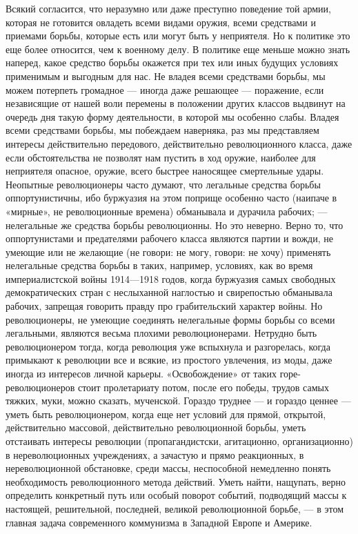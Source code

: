 \documentclass[12pt]{article}
\newcommand{\parnum}{(\arabic{parcount})}
\newcounter{parcount}
\newenvironment{parnumbers}{%
  \par%
  \everypar{\noindent \stepcounter{parcount}\marginpar[]{\parnum}}%
}{}
\begin{document}
\begin{parnumbers}
Всякий согласится, что неразумно или даже преступно поведение той армии, которая не готовится овладеть всеми видами оружия, всеми средствами и приемами борьбы, которые есть или могут быть у неприятеля. Но к политике это еще более относится, чем к военному делу. В политике еще меньше можно знать наперед, какое средство борьбы окажется при тех или иных будущих условиях применимым и выгодным для нас. Не владея всеми средствами борьбы, мы можем потерпеть громадное — иногда даже решающее — поражение, если независящие от нашей воли перемены в положении других классов выдвинут на очередь дня такую форму деятельности, в которой мы особенно слабы. Владея всеми средствами борьбы, мы побеждаем наверняка, раз мы представляем интересы действительно передового, действительно революционного класса, даже если обстоятельства не позволят нам пустить в ход оружие, наиболее для неприятеля опасное, оружие, всего быстрее наносящее смертельные удары. Неопытные революционеры часто думают, что легальные средства борьбы оппортунистичны, ибо буржуазия на этом поприще особенно часто (наипаче в «мирные», не революционные времена) обманывала и дурачила рабочих; — нелегальные же средства борьбы революционны. Но это неверно. Верно то, что оппортунистами и предателями рабочего класса являются партии и вожди, не умеющие или не желающие (не говори: не могу, говори: не хочу) применять нелегальные средства борьбы в таких, например, условиях, как во время империалистской войны 1914—1918 годов, когда буржуазия самых свободных демократических стран с неслыханной наглостью и свирепостью обманывала рабочих, запрещая говорить правду про грабительский характер войны. Но революционеры, не умеющие соединять нелегальные формы борьбы со всеми легальными, являются весьма плохими революционерами. Нетрудно быть революционером тогда, когда революция уже вспыхнула и разгорелась, когда примыкают к революции все и всякие, из простого увлечения, из моды, даже иногда из интересов личной карьеры. «Освобождение» от таких горе-революционеров стоит пролетариату потом, после его победы, трудов самых тяжких, муки, можно сказать, мученской. Гораздо труднее — и гораздо ценнее — уметь быть революционером, когда еще нет условий для прямой, открытой, действительно массовой, действительно революционной борьбы, уметь отстаивать интересы революции (пропагандистски, агитационно, организационно) в нереволюционных учреждениях, а зачастую и прямо реакционных, в нереволюционной обстановке, среди массы, неспособной немедленно понять необходимость революционного метода действий. Уметь найти, нащупать, верно определить конкретный путь или особый поворот событий, подводящий массы к настоящей, решительной, последней, великой революционной борьбе, — в этом главная задача современного коммунизма в Западной Европе и Америке.
\end{parnumbers}
\end{document}
